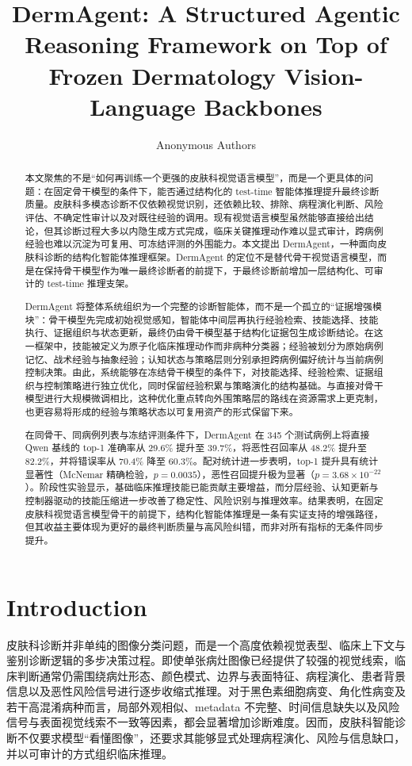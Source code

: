 \documentclass{article}
\title{DermAgent: A Structured Agentic Reasoning Framework on Top of Frozen Dermatology Vision-Language Backbones}
\author{Anonymous Authors}
\begin{document}
\maketitle

\begin{abstract}
本文聚焦的不是“如何再训练一个更强的皮肤科视觉语言模型”，而是一个更具体的问题：在固定骨干模型的条件下，能否通过结构化的 test-time 智能体推理提升最终诊断质量。皮肤科多模态诊断不仅依赖视觉识别，还依赖比较、排除、病程演化判断、风险评估、不确定性审计以及对既往经验的调用。现有视觉语言模型虽然能够直接给出结论，但其诊断过程大多以内隐生成方式完成，临床关键推理动作难以显式审计，跨病例经验也难以沉淀为可复用、可冻结评测的外围能力。本文提出 DermAgent，一种面向皮肤科诊断的结构化智能体推理框架。DermAgent 的定位不是替代骨干视觉语言模型，而是在保持骨干模型作为唯一最终诊断者的前提下，于最终诊断前增加一层结构化、可审计的 test-time 推理支架。

DermAgent 将整体系统组织为一个完整的诊断智能体，而不是一个孤立的“证据增强模块”：骨干模型先完成初始视觉感知，智能体中间层再执行经验检索、技能选择、技能执行、证据组织与状态更新，最终仍由骨干模型基于结构化证据包生成诊断结论。在这一框架中，技能被定义为原子化临床推理动作而非病种分类器；经验被划分为原始病例记忆、战术经验与抽象经验；认知状态与策略层则分别承担跨病例偏好统计与当前病例控制决策。由此，系统能够在冻结骨干模型的条件下，对技能选择、经验检索、证据组织与控制策略进行独立优化，同时保留经验积累与策略演化的结构基础。与直接对骨干模型进行大规模微调相比，这种优化重点转向外围策略层的路线在资源需求上更克制，也更容易将形成的经验与策略状态以可复用资产的形式保留下来。

在同骨干、同病例列表与冻结评测条件下，DermAgent 在 345 个测试病例上将直接 Qwen 基线的 top-1 准确率从 29.6\% 提升至 39.7\%，将恶性召回率从 48.2\% 提升至 82.2\%，并将错误率从 70.4\% 降至 60.3\%。配对统计进一步表明，top-1 提升具有统计显著性（McNemar 精确检验，$p=0.0035$），恶性召回提升极为显著（$p=3.68\times10^{-22}$）。阶段性实验显示，基础临床推理技能已能贡献主要增益，而分层经验、认知更新与控制器驱动的技能压缩进一步改善了稳定性、风险识别与推理效率。结果表明，在固定皮肤科视觉语言模型骨干的前提下，结构化智能体推理是一条有实证支持的增强路径，但其收益主要体现为更好的最终判断质量与高风险纠错，而非对所有指标的无条件同步提升。
\end{abstract}

\section{Introduction}

皮肤科诊断并非单纯的图像分类问题，而是一个高度依赖视觉表型、临床上下文与鉴别诊断逻辑的多步决策过程。即使单张病灶图像已经提供了较强的视觉线索，临床判断通常仍需围绕病灶形态、颜色模式、边界与表面特征、病程演化、患者背景信息以及恶性风险信号进行逐步收缩式推理。对于黑色素细胞病变、角化性病变及若干高混淆病种而言，局部外观相似、metadata 不完整、时间信息缺失以及风险信号与表面视觉线索不一致等因素，都会显著增加诊断难度。因而，皮肤科智能诊断不仅要求模型“看懂图像”，还要求其能够显式处理病程演化、风险与信息缺口，并以可审计的方式组织临床推理。
\end{document}
